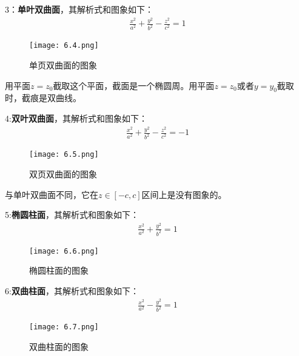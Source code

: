 \documentclass{ctexart}
\let\oldtextbf\textbf %
\renewcommand{\textbf}[1]{\textcolor{btex}{\oldtextbf{#1}}} %
\begin{document}
3：\textbf{单叶双曲面}，其解析式和图象如下：
\begin{align*}
    \frac{x^2}{a^2}+\frac{y^2}{b^2}-\frac{z^2}{c^2}=1\tag{6-18}
\end{align*}
\begin{figure}[H]    
\centering     
\renewcommand{\figurename}{图}     
\renewcommand{\thefigure}{6.4}    
\begin{myimagebox}[width=0.23\textwidth] %
\texttt{[image: 6.4.png]} %
\end{myimagebox}     
\caption{\label{fig:6.4}单页双曲面的图象}   
\end{figure}

用平面$z=z_0$截取这个平面，截面是一个椭圆周。用平面$z=z_0$或者$y=y_0$截取时，截痕是双曲线。

4:\textbf{双叶双曲面}，其解析式和图象如下：
\begin{align*}
    \frac{x^2}{a^2}+\frac{y^2}{b^2}-\frac{z^2}{c^2}=-1\tag{6-19}
\end{align*}

\begin{figure}[H]    
\centering     
\renewcommand{\figurename}{图}     
\renewcommand{\thefigure}{6.5}    
\begin{myimagebox}[width=0.23\textwidth] %
\texttt{[image: 6.5.png]} %
\end{myimagebox}     
\caption{\label{fig:6.5}双页双曲面的图象}   
\end{figure}
与单叶双曲面不同，它在$z\in [-c,c]$区间上是没有图象的。

5:\textbf{椭圆柱面}，其解析式和图象如下：
\begin{align*}
    \frac{x^2}{a^2}+\frac{y^2}{b^2}=1\tag{6-20}
\end{align*}
\begin{figure}[H]    
\centering     
\renewcommand{\figurename}{图}     
\renewcommand{\thefigure}{6.6}    
\begin{myimagebox}[width=0.23\textwidth] %
\texttt{[image: 6.6.png]} %
\end{myimagebox}     
\caption{\label{fig:6.6}椭圆柱面的图象}   
\end{figure}

6:\textbf{双曲柱面}，其解析式和图象如下：
\begin{align*}
    \frac{x^2}{a^2}-\frac{y^2}{b^2}=1\tag{6-21}
\end{align*}
\begin{figure}[H]    
\centering     
\renewcommand{\figurename}{图}     
\renewcommand{\thefigure}{6.7}    
\begin{myimagebox}[width=0.23\textwidth] %
\texttt{[image: 6.7.png]} %
\end{myimagebox}     
\caption{\label{fig:6.7}双曲柱面的图象}   
\end{figure}
\end{document}
